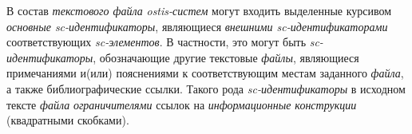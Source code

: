     В состав \textit{текстового файла} \textit{ostis-систем} могут входить выделенные курсивом \textit{основные sc-идентификаторы}, являющиеся \textit{внешними sc-идентификаторами} соответствующих \textit{sc-элементов}.
    В частности, это могут быть \textit{sc-идентификаторы}, обозначающие другие текстовые \textit{файлы}, являющиеся примечаниями и(или) пояснениями к соответствующим местам заданного \textit{файла}, а также библиографические ссылки.
    Такого рода \textit{sc-идентификаторы} в исходном тексте \textit{файла} \textit{ограничителями} ссылок на \textit{информационные конструкции} (квадратными скобками).

\begin{SCn}

        \begin{scnindent}
        \end{scnindent}

\end{SCn}

%